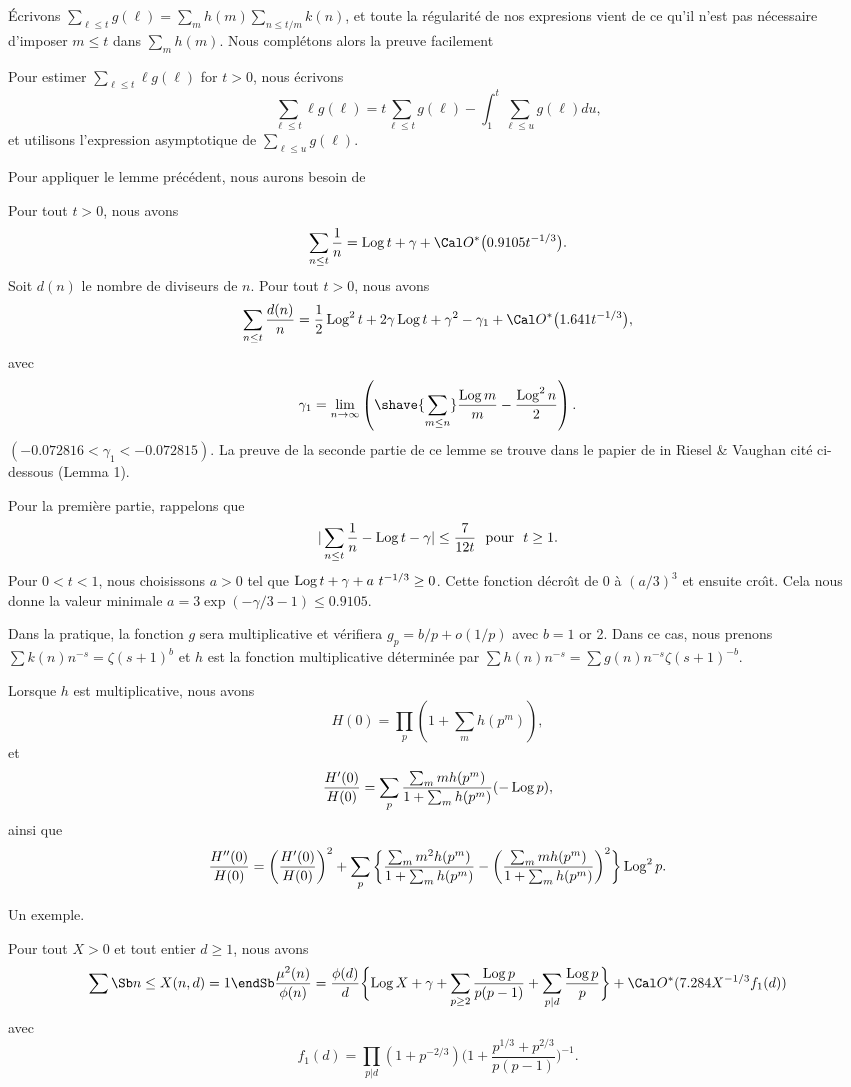 \'Ecrivons
$\sum_{\ell\le t}g({\ell})=\sum_{m}h(m)\sum_{n\le t/m}k(n)$, et toute
la r\'egularit\'e de nos expresions vient de ce qu'il n'est pas
n\'ecessaire d'imposer $m\le t$ dans $\sum_{m}h(m)$.
Nous compl\'etons alors la preuve facilement

Pour estimer $\sum_{\ell\le t}\ell g({\ell})$ for $t>0$, nous \'ecrivons
$$
\sum_{\ell\le t}\ell g({\ell})=
t\sum_{\ell\le t}g({\ell})-
\int_1^t \sum_{\ell\le u}g({\ell})du,
$$
et utilisons l'expression asymptotique de $\sum_{\ell\le u}g({\ell})$.
\fin


Pour appliquer le lemme pr\'ec\'edent, nous aurons besoin de

 Pour tout $t>0$, nous avons
$$
\sum_{n\le t}\frac 1n=\Log t+\gamma+\O\big(0.9105 t^{-1/3}\big).
$$
Soit $d(n)$ le nombre de diviseurs de $n$. Pour tout $t>0$, nous avons
$$
\sum_{n\le t}\frac{d(n)}n=
\frac12\Log^2t+2\gamma\Log t+\gamma^2-\gamma_1+\O\big(1.641 t^{-1/3}\big),
$$
avec
$$
\gamma_1=\lim_{n\rightarrow\infty}
\left(\shave{\sum_{m\le n}}\frac{\Log m}m-\frac{\Log^2n}2
\right).
$$
$(-0.072816<\gamma_1<-0.072815)$.
\endproclaim
\goodbreak
{}
La preuve de la seconde partie de ce lemme se trouve dans le papier de
in Riesel \& Vaughan cit\'e ci-dessous
(Lemma 1).

Pour la premi\`ere partie, rappelons que
$$
|\sum_{n\le t}\frac1n-\operatorname{Log} t-\gamma|\le\frac{7}{12t}
\text{\ \ pour\ \ }t\ge1.
$$
Pour $0<t<1$, nous choisissons $a>0$ tel que $\Log t+\gamma+a\ t^{-1/3}\ge0$. Cette
fonction d\'ecro\^\i t de $0$ \`a $(a/3)^3$ et ensuite cro\^\i t. Cela
nous donne la valeur minimale $a=3\exp(-\gamma/3-1)\le0.9105$.
\fin

Dans la pratique, la fonction $g$ sera multiplicative et v\'erifiera
$g_p=b/p+o(1/p)$ avec $b=1$ or 2. Dans ce cas, nous prenons $\sum
k(n)n^{-s}=\zeta(s+1)^b$ et $h$ est la fonction multiplicative
d\'etermin\'ee par $\sum h(n)n^{-s}=\sum g(n)n^{-s}\zeta(s+1)^{-b}$.

Lorsque $h$ est multiplicative, nous avons
$$
H(0)=\prod_p(1+\sum_mh({p^m})),
$$
et
$$
\frac{H^{\prime}(0)}{H(0)}=
\sum_p
\frac{\sum_mmh({p^m})}{1+\sum_mh({p^m})}(-\operatorname{Log} p),
$$
ainsi que
$$
\frac{H^{\prime\prime}(0)}{H(0)}=
\bigg(
\frac{H^{\prime}(0)}{H(0)}
\bigg)^2+
\sum_p
\bigg\{
\frac{\sum_mm^2h({p^m})}{1+\sum_mh({p^m})}
-\bigg(\frac{\sum_mmh({p^m})}{1+\sum_mh({p^m})}\bigg)^2
\bigg\}
\operatorname{Log}^2p.
$$

Un exemple.

 Pour tout $X>0$ et tout entier $d\ge1$, nous avons
$$
\sum\Sb n\le X\\ (n,d)=1\endSb
\frac{\mu^2(n)}{\phi(n)}=
\frac{\phi(d)}d
\bigg\{\!
\Log X+
\gamma+\sum_{p\ge2}\frac{\Log p}{p(p-1)}
+\sum_{p|d}\frac{\Log p}{p}
\bigg\}
+\O(
7.284 X^{-1/3}f_1(d))
$$
avec
$$
f_1(d)=
\prod_{p|d}
(1+p^{-2/3})
\big(1+\frac{p^{1/3}+p^{2/3}}{p(p-1)}\big)^{-1}.
$$
\endproclaim

